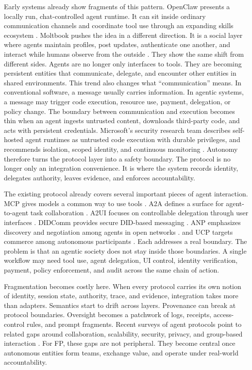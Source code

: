 \documentclass{foundationpaper}
\begin{document}
Early systems already show fragments of this pattern. OpenClaw presents a locally run, chat-controlled agent runtime. It can sit inside ordinary communication channels and coordinate tool use through an expanding skills ecosystem \cite{openclaw_site,openclaw_github}. Moltbook pushes the idea in a different direction. It is a social layer where agents maintain profiles, post updates, authenticate one another, and interact while humans observe from the outside \cite{moltbook_site,wired_moltbook}. They show the same shift from different sides. Agents are no longer only interfaces to tools. They are becoming persistent entities that communicate, delegate, and encounter other entities in shared environments.
This trend also changes what ``communication'' means. In conventional software, a message usually carries information. In agentic systems, a message may trigger code execution, resource use, payment, delegation, or policy change. The boundary between communication and execution becomes thin when an agent ingests untrusted content, downloads third-party code, and acts with persistent credentials. Microsoft's security research team describes self-hosted agent runtimes as untrusted code execution with durable privileges, and recommends isolation, scoped identity, and continuous monitoring \cite{microsoft_openclaw_security}. Autonomy therefore turns the protocol layer into a safety boundary. The protocol is no longer only an integration convenience. It is where the system records identity, delegates authority, leaves evidence, and enforces accountability.

The existing protocol already covers several important pieces of agent interaction. MCP gives models a common way to use tools \cite{mcp_spec}. A2A defines a surface for agent-to-agent task collaboration \cite{a2a_spec}. A2UI focuses on controllable delegation through user interfaces \cite{a2ui_spec}. DIDComm provides secure DID-based messaging \cite{didcomm_spec}. ANP emphasizes discovery and negotiation among agents in open networks \cite{anp_paper}. and UCP targets commerce among autonomous participants \cite{ucp_spec}. Each addresses a real boundary. The problem is that an agentic society does not stay inside those boundaries. A single workflow may need tool use, agent delegation, UI control, identity verification, payment, policy enforcement, and audit across the same chain of action.

Fragmentation becomes costly here. When every protocol carries its own notion of identity, session state, authority, trace, and evidence, integration takes more than adapters. Semantics start to drift across layers. Provenance can break at protocol boundaries. Oversight becomes a patchwork of logs, receipts, access-control rules, and prompt fragments. Recent surveys of agent protocols point to related gaps around collaboration, scalability, security, privacy, and group-based interaction \cite{yang2025survey}. For FP, these gaps are not peripheral. They become central once autonomous entities form teams, exchange value, and operate under real-world accountability.
\end{document}
